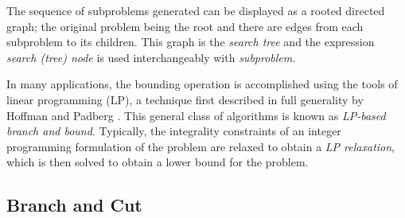

The sequence of subproblems generated can be displayed as a rooted directed
graph; the original problem being the root and there are edges from each
subproblem to its children. This graph is the {\em search tree} and the
expression {\em search (tree) node} is used interchangeably with 
{\em subproblem}.

In many applications, the bounding operation is accomplished using the
tools of linear programming (LP), a technique first described in full
generality by Hoffman and Padberg \cite{H&P}. This general class of
algorithms is known as {\em LP-based branch and bound}. Typically, the
integrality constraints of an integer programming formulation of the
problem are relaxed to obtain a {\em LP relaxation}, which is then
solved to obtain a lower bound for the problem.

\subsection{Branch and Cut}
\label{branchandcut}

